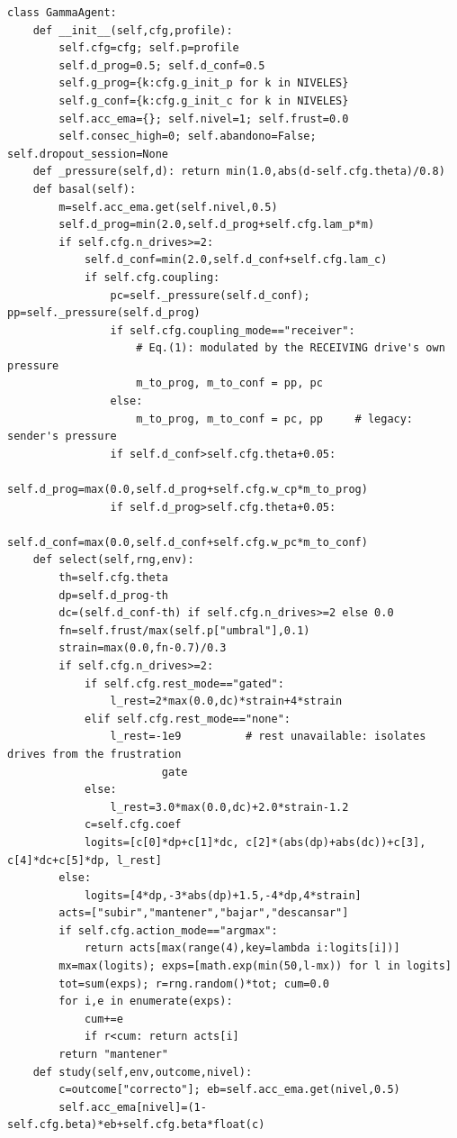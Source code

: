 \documentclass{article}
\begin{document}
\begin{verbatim}
class GammaAgent:
    def __init__(self,cfg,profile):
        self.cfg=cfg; self.p=profile
        self.d_prog=0.5; self.d_conf=0.5
        self.g_prog={k:cfg.g_init_p for k in NIVELES}
        self.g_conf={k:cfg.g_init_c for k in NIVELES}
        self.acc_ema={}; self.nivel=1; self.frust=0.0
        self.consec_high=0; self.abandono=False; self.dropout_session=None
    def _pressure(self,d): return min(1.0,abs(d-self.cfg.theta)/0.8)
    def basal(self):
        m=self.acc_ema.get(self.nivel,0.5)
        self.d_prog=min(2.0,self.d_prog+self.cfg.lam_p*m)
        if self.cfg.n_drives>=2:
            self.d_conf=min(2.0,self.d_conf+self.cfg.lam_c)
            if self.cfg.coupling:
                pc=self._pressure(self.d_conf); pp=self._pressure(self.d_prog)
                if self.cfg.coupling_mode=="receiver":
                    # Eq.(1): modulated by the RECEIVING drive's own pressure
                    m_to_prog, m_to_conf = pp, pc
                else:
                    m_to_prog, m_to_conf = pc, pp     # legacy: sender's pressure
                if self.d_conf>self.cfg.theta+0.05:
                    self.d_prog=max(0.0,self.d_prog+self.cfg.w_cp*m_to_prog)
                if self.d_prog>self.cfg.theta+0.05:
                    self.d_conf=max(0.0,self.d_conf+self.cfg.w_pc*m_to_conf)
    def select(self,rng,env):
        th=self.cfg.theta
        dp=self.d_prog-th
        dc=(self.d_conf-th) if self.cfg.n_drives>=2 else 0.0
        fn=self.frust/max(self.p["umbral"],0.1)
        strain=max(0.0,fn-0.7)/0.3
        if self.cfg.n_drives>=2:
            if self.cfg.rest_mode=="gated":
                l_rest=2*max(0.0,dc)*strain+4*strain
            elif self.cfg.rest_mode=="none":
                l_rest=-1e9          # rest unavailable: isolates drives from the frustration
                        gate
            else:
                l_rest=3.0*max(0.0,dc)+2.0*strain-1.2
            c=self.cfg.coef
            logits=[c[0]*dp+c[1]*dc, c[2]*(abs(dp)+abs(dc))+c[3], c[4]*dc+c[5]*dp, l_rest]
        else:
            logits=[4*dp,-3*abs(dp)+1.5,-4*dp,4*strain]
        acts=["subir","mantener","bajar","descansar"]
        if self.cfg.action_mode=="argmax":
            return acts[max(range(4),key=lambda i:logits[i])]
        mx=max(logits); exps=[math.exp(min(50,l-mx)) for l in logits]
        tot=sum(exps); r=rng.random()*tot; cum=0.0
        for i,e in enumerate(exps):
            cum+=e
            if r<cum: return acts[i]
        return "mantener"
    def study(self,env,outcome,nivel):
        c=outcome["correcto"]; eb=self.acc_ema.get(nivel,0.5)
        self.acc_ema[nivel]=(1-self.cfg.beta)*eb+self.cfg.beta*float(c)

\end{verbatim}
\end{document}
